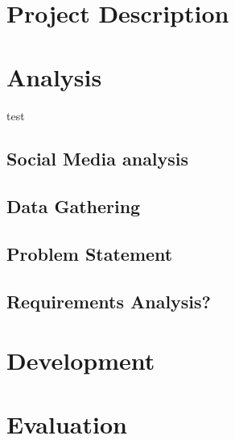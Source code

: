 \part*{Project Description}



\part{Analysis}
test

\chapter{Social Media analysis}\label{cha:SocialMediaAnalysis}






\chapter{Data Gathering}\label{cha:DataGathering}



\chapter{Problem Statement}


\chapter{Requirements Analysis?}


\part{Development}




%




\part{Evaluation}


